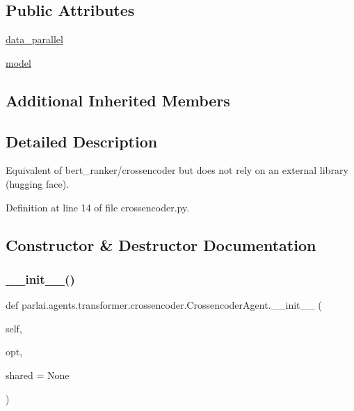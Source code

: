 \subsection*{Public Attributes}
\begin{DoxyCompactItemize}
\item 
\hyperlink{classparlai_1_1agents_1_1transformer_1_1crossencoder_1_1CrossencoderAgent_a991c76bbbb234ba482e3eaf3b6813bc8}{data\+\_\+parallel}
\item 
\hyperlink{classparlai_1_1agents_1_1transformer_1_1crossencoder_1_1CrossencoderAgent_a53447e9640405f06d1458eec65db5525}{model}
\end{DoxyCompactItemize}
\subsection*{Additional Inherited Members}


\subsection{Detailed Description}
\begin{DoxyVerb}Equivalent of bert_ranker/crossencoder but does not rely on an external library
(hugging face).
\end{DoxyVerb}
 

Definition at line 14 of file crossencoder.\+py.



\subsection{Constructor \& Destructor Documentation}
\mbox{\label{classparlai_1_1agents_1_1transformer_1_1crossencoder_1_1CrossencoderAgent_a22295a739ff290d96c45efd0bfd550bb}} 
\subsubsection{\texorpdfstring{\+\_\+\+\_\+init\+\_\+\+\_\+()}{\_\_init\_\_()}}
{\footnotesize\ttfamily def parlai.\+agents.\+transformer.\+crossencoder.\+Crossencoder\+Agent.\+\_\+\+\_\+init\+\_\+\+\_\+ (\begin{DoxyParamCaption}\item[{}]{self,  }\item[{}]{opt,  }\item[{}]{shared = {\ttfamily None} }\end{DoxyParamCaption})}



